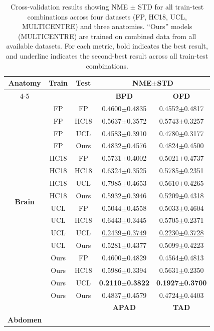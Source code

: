 \begin{table}[t]
\centering
\caption{Cross-validation results showing NME $\pm$ STD for all train-test combinations across four datasets (FP, HC18, UCL, MULTICENTRE) and three anatomies. ``Ours'' models (MULTICENTRE) are trained on combined data from all available datasets. For each metric, bold indicates the best result, and underline indicates the second-best result across all train-test combinations.}
\label{tab:cross_validation}
\begin{tabular}{|c|c|c|c|c|}
\hline
\textbf{Anatomy} & \textbf{Train} & \textbf{Test} & \multicolumn{2}{c|}{\textbf{NME$\pm$STD}} \\ \cline{4-5}
\textbf{} & \textbf{} & \textbf{} & \textbf{BPD} & \textbf{OFD} \\ \hline
\multirow{16}{*}{\textbf{Brain}}
 & FP & FP & 0.4600$\pm$0.4835 & 0.4552$\pm$0.4817\\
 & FP & HC18 & 0.5637$\pm$0.3572 & 0.5743$\pm$0.3257\\
 & FP & UCL & 0.4583$\pm$0.3910 & 0.4780$\pm$0.3177\\
 & FP & Ours & 0.4832$\pm$0.4576 & 0.4824$\pm$0.4500\\
 \cline{2-5}
 & HC18 & FP & 0.5731$\pm$0.4002 & 0.5021$\pm$0.4737\\
 & HC18 & HC18 & 0.6324$\pm$0.3525 & 0.5785$\pm$0.2351\\
 & HC18 & UCL & 0.7985$\pm$0.4653 & 0.5610$\pm$0.4265\\
 & HC18 & Ours & 0.5932$\pm$0.3946 & 0.5209$\pm$0.4318\\
 \cline{2-5}
 & UCL & FP & 0.5044$\pm$0.4558 & 0.5033$\pm$0.4604\\
 & UCL & HC18 & 0.6443$\pm$0.3445 & 0.5705$\pm$0.2371\\
 & UCL & UCL & \underline{0.2439$\pm$0.3749} & \underline{0.2230$\pm$0.3728}\\
 & UCL & Ours & 0.5281$\pm$0.4377 & 0.5099$\pm$0.4223\\
 \cline{2-5}
 & Ours & FP & 0.4600$\pm$0.4829 & 0.4564$\pm$0.4813\\
 & Ours & HC18 & 0.5986$\pm$0.3394 & 0.5631$\pm$0.2350\\
 & Ours & UCL & \textbf{0.2110$\pm$0.3822} & \textbf{0.1927$\pm$0.3700}\\
 & Ours & Ours & 0.4837$\pm$0.4579 & 0.4724$\pm$0.4403\\
 \hline
\textbf{} & \textbf{} & \textbf{} & \textbf{APAD} & \textbf{TAD} \\ \hline
\multirow{9}{*}{\textbf{Abdomen}}

\end{tabular}
\end{table}
